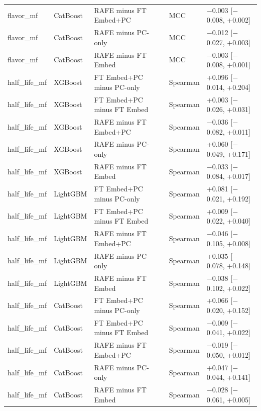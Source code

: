 \begin{longtable}{llllp{4.2cm}}
flavor\_mf & CatBoost & RAFE minus FT Embed+PC & MCC & $-$0.003 [$-$0.008, +0.002] \\
flavor\_mf & CatBoost & RAFE minus PC-only & MCC & $-$0.012 [$-$0.027, +0.003] \\
flavor\_mf & CatBoost & RAFE minus FT Embed & MCC & $-$0.003 [$-$0.008, +0.001] \\
half\_life\_mf & XGBoost & FT Embed+PC minus PC-only & Spearman & +0.096 [$-$0.014, +0.204] \\
half\_life\_mf & XGBoost & FT Embed+PC minus FT Embed & Spearman & +0.003 [$-$0.026, +0.031] \\
half\_life\_mf & XGBoost & RAFE minus FT Embed+PC & Spearman & $-$0.036 [$-$0.082, +0.011] \\
half\_life\_mf & XGBoost & RAFE minus PC-only & Spearman & +0.060 [$-$0.049, +0.171] \\
half\_life\_mf & XGBoost & RAFE minus FT Embed & Spearman & $-$0.033 [$-$0.084, +0.017] \\
half\_life\_mf & LightGBM & FT Embed+PC minus PC-only & Spearman & +0.081 [$-$0.021, +0.192] \\
half\_life\_mf & LightGBM & FT Embed+PC minus FT Embed & Spearman & +0.009 [$-$0.022, +0.040] \\
half\_life\_mf & LightGBM & RAFE minus FT Embed+PC & Spearman & $-$0.046 [$-$0.105, +0.008] \\
half\_life\_mf & LightGBM & RAFE minus PC-only & Spearman & +0.035 [$-$0.078, +0.148] \\
half\_life\_mf & LightGBM & RAFE minus FT Embed & Spearman & $-$0.038 [$-$0.102, +0.022] \\
half\_life\_mf & CatBoost & FT Embed+PC minus PC-only & Spearman & +0.066 [$-$0.020, +0.152] \\
half\_life\_mf & CatBoost & FT Embed+PC minus FT Embed & Spearman & $-$0.009 [$-$0.041, +0.022] \\
half\_life\_mf & CatBoost & RAFE minus FT Embed+PC & Spearman & $-$0.019 [$-$0.050, +0.012] \\
half\_life\_mf & CatBoost & RAFE minus PC-only & Spearman & +0.047 [$-$0.044, +0.141] \\
half\_life\_mf & CatBoost & RAFE minus FT Embed & Spearman & $-$0.028 [$-$0.061, +0.005] \\
\end{longtable}
